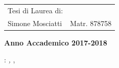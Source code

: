 \begin{center}
\begin{flushright}
\begin{tabular}{l l }
Tesi di Laurea di: & \\
Simone Mosciatti & Matr. 878758
\end{tabular}
\end{flushright}
\vspace{43mm}
{\large{\textbf{ Anno Accademico 2017-2018}}}
\end{center}


\thispagestyle{empty}

\hfill

\vfill

\noindent\myName: \textit{\myTitle,} \mySubtitle, %
\textcopyright\ \myTime

%
%
%
%
%
